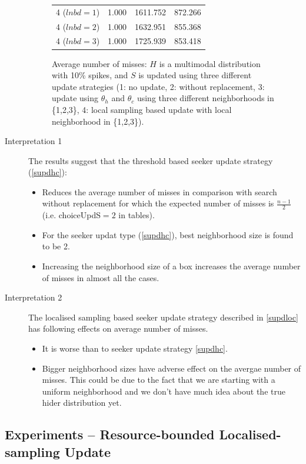 \documentclass[11pt,a4paper]{article}
\begin{document}
\begin{description}
\begin{figure}[!h]
\begin{tabular}{llll}
		4 ($lnbd=1$) & 1.000 & 1611.752 & 872.266 \\
		4 ($lnbd=2$) & 1.000 & 1632.951 & 855.368 \\
		4 ($lnbd=3$) & 1.000 & 1725.939 & 853.418 \\
		\hline 
		\hline 
	\end{tabular}
	\caption{Average number of misses: $H$ is a multimodal distribution with 10\% spikes, and $S$ is updated using three different update strategies (1: no update, 2: without replacement, 3: update using $\theta_h$ and $\theta_c$ using three different neighborhoods in \{1,2,3\}, 4: local sampling based update with local neighborhood in \{1,2,3\}).}
	\end{figure}
		
	\item[Interpretation 1] The results suggest that the threshold based seeker update strategy (\ref{supdhc}):
	\begin{itemize}
		\item Reduces the average number of misses in comparison with search without replacement for which the expected number of misses is $\frac{n-1}{2}$ (i.e. choiceUpdS$=2$ in tables).
		\item For the seeker updat type (\ref{supdhc}), best neighborhood size is found to be 2. 
		\item Increasing the neighborhood size of a box increases the average number of misses in almost all the cases.
	\end{itemize}

	\item[Interpretation 2] The localised sampling based seeker update strategy described in \ref{supdloc} has following effects on average number of misses.
	\begin{itemize}
		\item It is worse than to seeker update strategy \ref{supdhc}.
		\item Bigger neighborhood sizes have adverse effect on the avergae number of misses. This could be due to the fact that we are starting with a uniform neighborhood and we don't have much idea about the true hider distribution yet.
	\end{itemize}
\end{description}

\subsection{Experiments -- Resource-bounded Localised-sampling Update}
\end{document}
